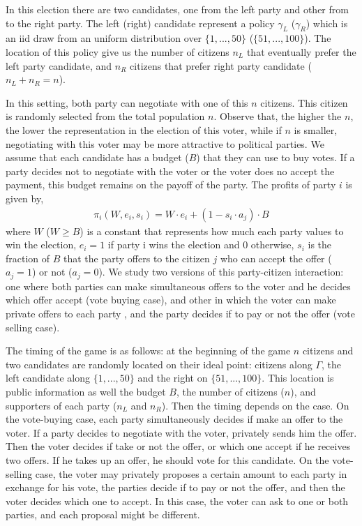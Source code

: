 \documentclass[onesided]{article}\usepackage[]{graphicx}\usepackage[]{color}
\begin{document}
In this election there are two candidates, one from the left party and other from to the right party. The left (right) candidate represent a policy $\gamma_L$ ($\gamma_R$) which is an iid draw from an uniform distribution over $\{1,...,50\}$ ($\{51,...,100\}$). The location of this policy give us the number of citizens $n_L$ that eventually prefer the left party candidate, and $n_R$ citizens that prefer right party candidate ($n_L+n_R=n$).

In this setting, both party can negotiate with one of this $n$ citizens. This citizen is randomly selected from the total population $n$.  Observe that, the higher the $ n $, the lower the representation in the election of this voter, while if $n$ is smaller, negotiating with this voter may be more attractive to political parties. We assume that each candidate has a budget ($B$) that they can use to buy votes. If a party decides not to negotiate with the voter or the voter does no accept the payment, this budget remains on the payoff of the party. The profits of party $i$ is given by,
\begin{align*}
  \pi_i(W,e_i,s_i)=W\cdot e_i+(1-s_i\cdot a_j )\cdot B
\end{align*}
where $W$ ($W\geq B$) is a constant that represents how much each party values to win the election, $e_i=1$ if party i wins the election and 0 otherwise,  $s_i$ is the fraction of $B$ that the party offers to the citizen $j$ who can accept the offer ($a_j=1$) or not ($a_j=0$). We study two versions of this party-citizen interaction: one where both parties can make simultaneous offers to the voter and he decides which offer accept (vote buying case), and other in which the voter can make private offers to each party , and the party decides if to pay or not the offer (vote selling case).

The timing of the game is as follows: at the beginning of the game $n$ citizens and two candidates are randomly located on their ideal point: citizens  along $\Gamma$, the left candidate along $\{1,...,50\}$ and the right on $\{51,...,100\}$. This location is public information as well the budget $B$, the number of citizens ($n$), and supporters of each party ($n_L$ and $n_R$). Then the timing depends on the case. On the vote-buying case, each party simultaneously decides if make an offer to the voter. If a party decides to negotiate with the voter, privately sends him the offer. Then the voter decides if take or not the offer, or which one accept if he receives two offers. If he takes up an offer, he should vote  for this candidate. On the vote-selling case, the voter may privately proposes a certain amount to each party in exchange for his vote, the parties decide if to pay or not the offer, and then the voter decides which one to accept. In this case, the voter can ask to one or both parties, and each proposal might be different.
\end{document}
